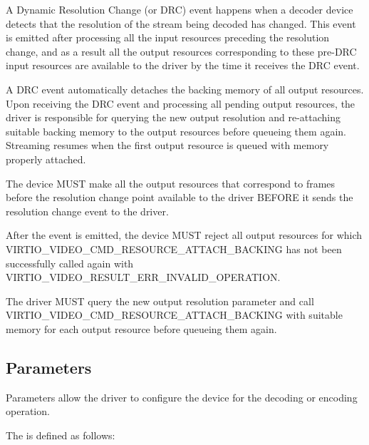 A Dynamic Resolution Change (or DRC) event happens when a decoder device
detects that the resolution of the stream being decoded has changed.
This event is emitted after processing all the input resources preceding
the resolution change, and as a result all the output resources
corresponding to these pre-DRC input resources are available to the
driver by the time it receives the DRC event.

A DRC event automatically detaches the backing memory of all output
resources. Upon receiving the DRC event and processing all pending
output resources, the driver is responsible for querying the new output
resolution and re-attaching suitable backing memory to the output
resources before queueing them again. Streaming resumes when the first
output resource is queued with memory properly attached.


The device MUST make all the output resources that correspond to frames
before the resolution change point available to the driver BEFORE it
sends the resolution change event to the driver.

After the event is emitted, the device MUST reject all output resources
for which VIRTIO\_VIDEO\_CMD\_RESOURCE\_ATTACH\_BACKING has not been
successfully called again with
VIRTIO\_VIDEO\_RESULT\_ERR\_INVALID\_OPERATION.


The driver MUST query the new output resolution parameter and call
VIRTIO\_VIDEO\_CMD\_RESOURCE\_ATTACH\_BACKING with suitable memory for
each output resource before queueing them again.

\subsection{Parameters}\label{sec:Device Types / Video Device / Parameters}

Parameters allow the driver to configure the device for the decoding or
encoding operation.

The  is defined as follows:

